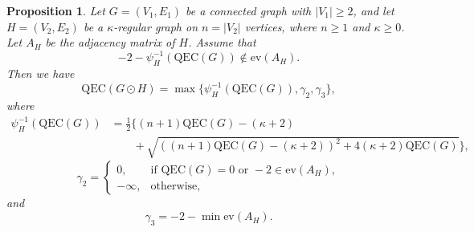 \documentclass[pdflatex,sn-mathphys-num]{sn-jnl}
\theoremstyle{thmstyleone}%
\newtheorem{proposition}[theorem]{Proposition}%
\theoremstyle{thmstyletwo}%
\theoremstyle{thmstylethree}%
\begin{document}
\begin{proposition}\label{prop:corona graph of G and H}
Let $G=(V_1,E_1)$ be a connected graph with $|V_1|\ge 2$, and let 
$H=(V_2,E_2)$ be a $\kappa$-regular graph on $n=|V_2|$ vertices, where $n\geq 1$ and $\kappa\geq 0$. 
Let $A_H$ be the adjacency matrix of $H$.
Assume that
\begin{equation}\label{eq:condition-spectrum graph of G and H}
-2-\psi_H^{-1}(\mathrm{QEC}(G))
\notin \mathrm{ev}(A_H).
\end{equation}
Then we have
\begin{equation}\label{eq:qec-corona graph of G and H}
\mathrm{QEC}(G\odot H)
=
\max\{
\psi_H^{-1}(\mathrm{QEC}(G)),\gamma_2,\gamma_3
\},
\end{equation}
where
\begin{equation}
\begin{split}\label{eq: psi of G and H}
\psi_H^{-1}(\mathrm{QEC}(G))&=\frac{1}{2}\bigg\{(n+1)\mathrm{QEC}(G)-(\kappa+2)\\
&\qquad+\sqrt{\left((n+1)\mathrm{QEC}(G)-(\kappa+2)\right)^2+4(\kappa+2)\mathrm{QEC}(G)}\bigg\},
\end{split}
\end{equation}
\begin{equation}\label{eq:gamma2-graph of G and H}
\gamma_2=
\begin{cases}
0, & \text{if } \mathrm{QEC}(G)=0 \text{ or } -2\in \mathrm{ev}(A_H),\\
-\infty, & \text{otherwise},
\end{cases}
\end{equation}
and
\begin{equation}\label{eq:gamma3-graph of G and H}
\gamma_3
=
-2-\min \mathrm{ev}(A_H).
\end{equation}
\end{proposition}
\end{document}
